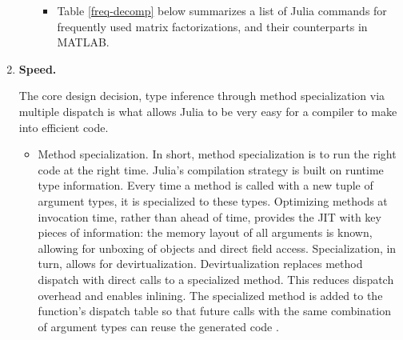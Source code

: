 \begin{enumerate}
\begin{itemize}
\begin{itemize}
\item 
Table \ref{freq-decomp} below summarizes a list of Julia commands for frequently used 
matrix factorizations, and their counterparts in MATLAB. 

\begin{table}[H]
\centering
{}
\caption{Interfaces of commonly used matrix decompositions 
in Julia and MATLAB} \label{freq-decomp}
\end{table}
\end{itemize}

\end{itemize} 


\item {\bf Speed.}  

The core design decision, type inference through method specialization 
via multiple dispatch is what allows Julia to be very easy for 
a compiler to make into efficient code. 

\begin{itemize} 
\item Method specialization.
In short, method specialization is to run the right code at the right time. Julia’s compilation strategy is built on runtime type information. Every time a method is called with a new tuple of argument types, it is specialized to these types. Optimizing methods at invocation time, rather than ahead of time, provides the JIT with key pieces of information: the memory layout of all arguments is known, allowing for unboxing of objects and direct field access. Specialization, in turn, allows for devirtualization. Devirtualization replaces method dispatch with direct calls to a specialized method. This reduces dispatch overhead and enables inlining. The specialized method is added to the function’s dispatch table so that future calls with the same combination of argument types can reuse the generated code \cite{bezanson2018julia}.


\end{itemize}
\end{enumerate}
